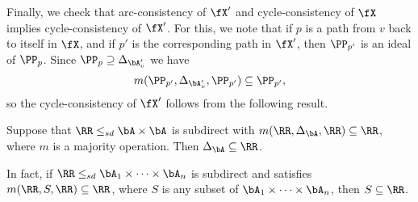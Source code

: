 Finally, we check that arc-consistency of $\fX'$ and cycle-consistency of $\fX$ implies cycle-consistency of $\fX'$. For this, we note that if $p$ is a path from $v$ back to itself in $\fX$, and if $p'$ is the corresponding path in $\fX'$, then $\PP_{p'}$ is an ideal of $\PP_p$. Since $\PP_p \supseteq \Delta_{\bA_v'}$ we have
\[
m(\PP_{p'}, \Delta_{\bA_v'}, \PP_{p'}) \subseteq \PP_{p'},
\]
so the cycle-consistency of $\fX'$ follows from the following result.

\begin{thm}\label{ideal-diagonal} Suppose that $\RR \le_{sd} \bA\times \bA$ is subdirect with $m(\RR,\Delta_{\bA},\RR) \subseteq \RR$, where $m$ is a majority operation. Then $\Delta_{\bA} \subseteq \RR$.

In fact, if $\RR \le_{sd} \bA_1 \times \cdots \times \bA_n$ is subdirect and satisfies $m(\RR,S,\RR) \subseteq \RR$, where $S$ is any subset of $\bA_1 \times \cdots \times \bA_n$, then $S \subseteq \RR$.
\end{thm}
